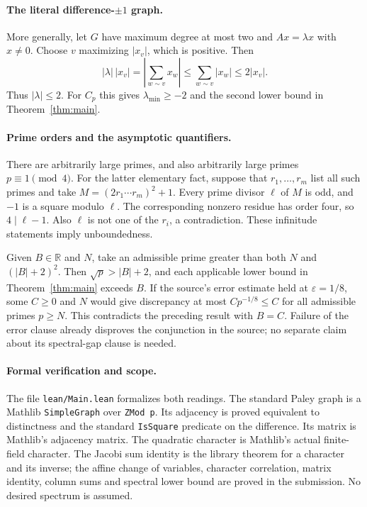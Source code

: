 \documentclass[11pt]{article}
\begin{document}
\paragraph{The literal difference-$\pm1$ graph.}
More generally, let $G$ have maximum degree at most two and $Ax=\lambda x$
with $x\ne0$. Choose $v$ maximizing $|x_v|$, which is positive. Then
\[
 |\lambda|\,|x_v|
 =\left|\sum_{w\sim v}x_w\right|
 \leq\sum_{w\sim v}|x_w|\leq2|x_v|.
\]
Thus $|\lambda|\leq2$. For $C_p$ this gives
$\lambda_{\min}\geq-2$ and the second lower bound in
Theorem~\ref{thm:main}.

\paragraph{Prime orders and the asymptotic quantifiers.}
There are arbitrarily large primes, and also arbitrarily large primes
$p\equiv1\pmod4$. For the latter elementary fact, suppose that
$r_1,\ldots,r_m$ list all such primes and take
$M=(2r_1\cdots r_m)^2+1$. Every prime divisor $\ell$ of $M$ is odd,
and $-1$ is a square modulo $\ell$. The corresponding nonzero residue
has order four, so $4\mid\ell-1$. Also $\ell$ is not one of the $r_i$,
a contradiction. These infinitude statements imply unboundedness.

Given $B\in\mathbb R$ and $N$, take an admissible prime greater than both
$N$ and $(|B|+2)^2$. Then $\sqrt p>|B|+2$, and each applicable lower bound
in Theorem~\ref{thm:main} exceeds $B$.
If the source's error estimate held at $\varepsilon=1/8$, some $C\geq0$
and $N$ would give discrepancy at most $Cp^{-1/8}\leq C$ for all
admissible primes $p\geq N$. This contradicts the preceding result with
$B=C$. Failure of the error clause already disproves the conjunction in
the source; no separate claim about its spectral-gap clause is needed.

\paragraph{Formal verification and scope.}
The file \texttt{lean/Main.lean} formalizes both readings. The standard
Paley graph is a Mathlib \texttt{SimpleGraph} over \texttt{ZMod p}.
Its adjacency is proved equivalent to distinctness and the standard
\texttt{IsSquare} predicate on the difference. Its matrix is Mathlib's
adjacency matrix. The quadratic character is Mathlib's actual finite-field
character. The Jacobi sum identity is the library theorem for a character
and its inverse; the affine change of variables, character correlation,
matrix identity, column sums and spectral lower bound are proved in the
submission. No desired spectrum is assumed.
\end{document}
